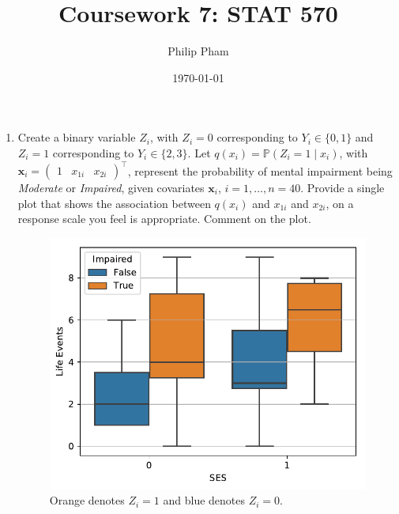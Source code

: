 \documentclass[letterpaper,11pt]{article}
\title{Coursework 7: STAT 570}
\author{Philip Pham}
\date{\today}
\begin{document}
\maketitle
\begin{enumerate}
\item Create a binary variable $Z_i$, with $Z_i = 0$ corresponding to
  $Y_i \in \{0,1\}$ and $Z_i = 1$ corresponding to $Y_i \in \{2,3\}$. Let
  $q\left(x_i\right) = \mathbb{P}(Z_i = 1 \mid x_i)$, with
  $\mathbf{x}_i = \begin{pmatrix} 1 & x_{1i} & x_{2i}
  \end{pmatrix}^\intercal$, represent the probability of mental impairment being
  \emph{Moderate} or \emph{Impaired}, given covariates $\mathbf{x}_i$,
  $i = 1,\ldots,n = 40$.  Provide a single plot that shows the association
  between $q\left(x_i\right)$ and $x_{1i}$ and $x_{2i}$, on a response scale
  you feel is appropriate. Comment on the plot.

  \begin{figure}[h]
    \centering
    \includegraphics{p1_descriptive.pdf}
    \caption{Orange denotes $Z_i = 1$ and blue denotes $Z_i = 0$.}
    \label{fig:p1_descriptive}
  \end{figure}
  

\end{enumerate}
\end{document}
